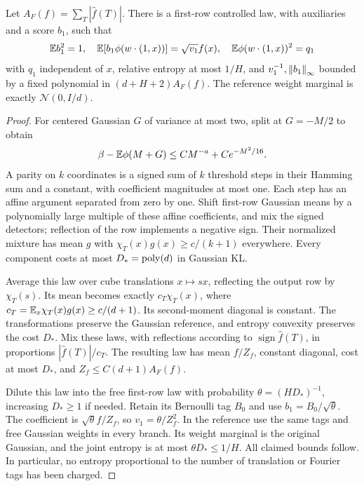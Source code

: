 \begin{lemma}\label{ac-seed}
Let $A_F(f)=\sum_T|\widehat f(T)|$. There is a first-row controlled
law, with auxiliaries and a score $b_1$, such that
\[
 \mathbb E b_1^2=1,\quad \mathbb E[b_1\phi(w\cdot(1,x))]=\sqrt{v_1}f(x),
 \quad \mathbb E\phi(w\cdot(1,x))^2=q_1
\]
with $q_1$ independent of $x$, relative entropy at most $1/H$, and
$v_1^{-1},\left\lVert b_1\right\rVert_\infty$ bounded by a fixed polynomial in
$(d+H+2)A_F(f)$. The reference weight marginal is exactly
$\mathcal N(0,I/d)$.
\end{lemma}
\begin{proof}
For centered Gaussian $G$ of variance at most two, split at $G=-M/2$
to obtain
\[
 \beta-\mathbb E\phi(M+G)\le CM^{-a}+Ce^{-M^2/16}.
\]
A parity on $k$ coordinates is a signed sum of $k$ threshold steps
in their Hamming sum and a constant, with coefficient magnitudes
at most one. Each step has an affine argument separated from zero
by one. Shift first-row Gaussian means by a polynomially large
multiple of these affine coefficients, and mix the signed detectors;
reflection of the row implements a negative sign. Their normalized
mixture has mean $g$ with $\chi_T(x)g(x)\ge c/(k+1)$ everywhere.
Every component costs at most $D_* =\operatorname{poly}(d)$ in Gaussian KL.

Average this law over cube translations $x\mapsto s x$, reflecting
the output row by $\chi_T(s)$. Its mean becomes exactly
$c_T\chi_T(x)$, where $c_T=\mathbb E_x\chi_T(x)g(x)\ge c/(d+1)$.
Its second-moment diagonal is constant. The transformations preserve
the Gaussian reference, and entropy convexity preserves the cost
$D_*$. Mix these laws, with reflections according to
$\operatorname{sign}\widehat f(T)$, in proportions
$|\widehat f(T)|/c_T$. The resulting law has mean $f/Z_f$,
constant diagonal, cost at most $D_*$, and
$Z_f\le C(d+1)A_F(f)$.

Dilute this law into the free first-row law with probability
$\theta=(HD_*)^{-1}$, increasing $D_*\ge1$ if needed. Retain its
Bernoulli tag $B_0$ and use $b_1=B_0/\sqrt\theta$. The coefficient
is $\sqrt\theta f/Z_f$, so $v_1=\theta/Z_f^2$. In the reference
use the same tags and free Gaussian weights in every branch. Its
weight marginal is the original Gaussian, and the joint entropy is
at most $\theta D_*\le1/H$. All claimed bounds follow. In particular,
no entropy proportional to the number of translation or Fourier tags
has been charged.
\end{proof}

